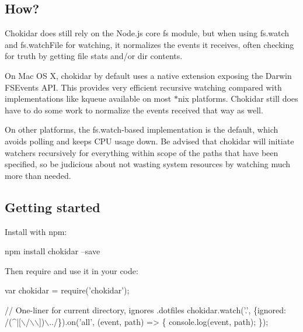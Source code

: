 \subsection*{How?}

Chokidar does still rely on the Node.\+js core {\ttfamily fs} module, but when using {\ttfamily fs.\+watch} and {\ttfamily fs.\+watch\+File} for watching, it normalizes the events it receives, often checking for truth by getting file stats and/or dir contents.

On Mac OS X, chokidar by default uses a native extension exposing the Darwin {\ttfamily F\+S\+Events} A\+PI. This provides very efficient recursive watching compared with implementations like {\ttfamily kqueue} available on most $\ast$nix platforms. Chokidar still does have to do some work to normalize the events received that way as well.

On other platforms, the {\ttfamily fs.\+watch}-\/based implementation is the default, which avoids polling and keeps C\+PU usage down. Be advised that chokidar will initiate watchers recursively for everything within scope of the paths that have been specified, so be judicious about not wasting system resources by watching much more than needed.

\subsection*{Getting started}

Install with npm\+: \begin{DoxyVerb}npm install chokidar --save
\end{DoxyVerb}


Then {\ttfamily require} and use it in your code\+:


\begin{DoxyCode}
var chokidar = require('chokidar');

// One-liner for current directory, ignores .dotfiles
chokidar.watch('.', \{ignored: /(^|[\(\backslash\)/\(\backslash\)\(\backslash\)])\(\backslash\)../\}).on('all', (event, path) => \{
  console.log(event, path);
\});
\end{DoxyCode}



